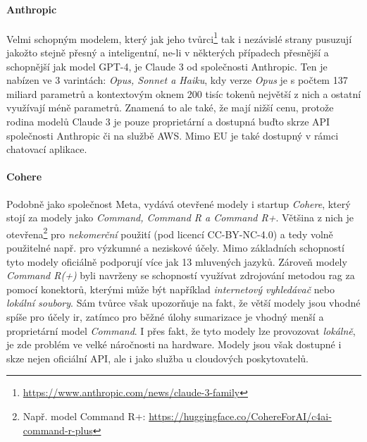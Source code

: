 \documentclass[czech, ma, kiv, he, iso690alph, pdf, viewonly]{fasthesis}
\begin{document}
    \paragraph{Anthropic} Velmi schopným modelem, který jak jeho tvůrci\footnote{\url{https://www.anthropic.com/news/claude-3-family}} tak i nezávislé strany pusuzují jakožto stejně přesný a inteligentní, ne-li v některých případech přesnější a schopnější jak model GPT-4, je Claude 3 od společnosti Anthropic. \cite{kevian2024capabilities} Ten je nabízen ve 3 varintách: \textit{Opus, Sonnet a Haiku}, kdy verze \textit{Opus} je s počtem 137 miliard parametrů a kontextovým oknem 200 tisíc tokenů největší z nich a ostatní využívají méně parametrů. Znamená to ale také, že mají nižší cenu, protože rodina modelů Claude 3 je pouze proprietární a dostupná buďto skrze API společnosti Anthropic či na službě AWS. Mimo EU je také dostupný v rámci chatovací aplikace. \cite{anthropic2023claude}

    \paragraph{Cohere} Podobně jako společnost Meta, vydává otevřené modely i startup \textit{Cohere}, který stojí za modely jako \textit{Command, Command R a Command R+}. Většina z nich je otevřena\footnote{Např. model Command R+: \url{https://huggingface.co/CohereForAI/c4ai-command-r-plus}} pro \emph{nekomerční} použití (pod licencí CC-BY-NC-4.0) a tedy volně použitelné např. pro výzkumné a neziskové účely. Mimo základních schopností tyto modely oficiálně podporují více jak 13 mluvených jazyků. Zároveň modely \textit{Command R(+)} byli navrženy se schopností využívat zdrojování metodou \Gls{rag} za pomocí konektorů, kterými může být například \textit{internetový vyhledávač} nebo \textit{lokální soubory}. Sám tvůrce však upozorňuje na fakt, že větší modely jsou vhodné spíše pro účely \Acrshort{ir}, zatímco pro běžné úlohy sumarizace je vhodný menší a proprietární model \textit{Command}. I přes fakt, že tyto modely lze provozovat \textit{lokálně}, je zde problém ve velké náročnosti na hardware. Modely jsou však dostupné i skze nejen oficiální API, ale i jako služba u cloudových poskytovatelů. \cite{cohere_models} \cite{ruder_command_r}
\end{document}
